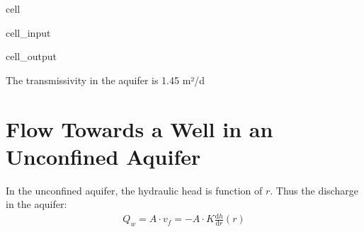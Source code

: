 \documentclass[letterpaper,10pt,english]{jupyterBook}
\let\sphinxpxdimen\pdfpxdimen\else\newdimen\sphinxpxdimen
\begin{document}
\begin{sphinxuseclass}{cell}
\begin{sphinxVerbatimInput}
\begin{sphinxuseclass}{cell_input}
\end{sphinxuseclass}\end{sphinxVerbatimInput}
\begin{sphinxVerbatimOutput}

\begin{sphinxuseclass}{cell_output}
\begin{sphinxVerbatim}[commandchars=\\\{\}]

The transmissivity in the aquifer is 1.45 m²/d
\end{sphinxVerbatim}

\end{sphinxuseclass}\end{sphinxVerbatimOutput}

\end{sphinxuseclass}

\section{Flow Towards a Well in an Unconfined Aquifer}
\label{\detokenize{content/flow/L8/18_wells:flow-towards-a-well-in-an-unconfined-aquifer}}
\sphinxAtStartPar
In the unconfined aquifer, the hydraulic head is function of \(r\). Thus the discharge in the aquifer:
\begin{equation*}
\begin{split}
Q_w = A \cdot v_f = - A \cdot K \frac{\textrm{d}h}{\textrm{d}r}(r) \tag{U1}
\end{split}
\end{equation*}
\noindent{\hspace*{\fill}\sphinxincludegraphics[width=300\sphinxpxdimen]{{L08_f9}.png}\hspace*{\fill}}
\end{document}
